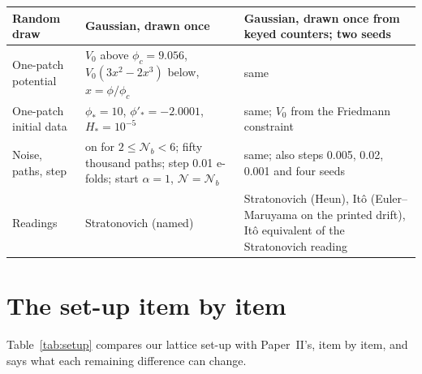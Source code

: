 \documentclass[aps,prd,twocolumn,10pt,superscriptaddress,nofootinbib,longbibliography,floatfix]{revtex4-2}
\newcommand{\Ptwo}{Paper~II}
\begin{document}
\begin{table}
\begin{tabular}{p{}p{}p{}}
Random draw & Gaussian, drawn once & Gaussian, drawn once from keyed counters; two seeds \\
\midrule
One-patch potential & $V_0$ above $\phi_c = 9.056$, $V_0(3x^2-2x^3)$ below, $x = \phi/\phi_c$ & same \\
One-patch initial data & $\phi_* = 10$, $\phi'_* = -2.0001$, $H_* = 10^{-5}$ & same; $V_0$ from the Friedmann constraint \\
Noise, paths, step & on for $2 \le \mathcal{N}_b < 6$; fifty thousand paths; step 0.01 e-folds; start $\alpha = 1$, $\mathcal{N} = \mathcal{N}_b$ & same; also steps 0.005, 0.02, 0.001 and four seeds \\
Readings & Stratonovich (named) & Stratonovich (Heun), It\^o (Euler--Maruyama on the printed drift), It\^o equivalent of the Stratonovich reading \\
\bottomrule
\end{tabular}
\end{table}

\section{The set-up item by item}\label{app:setup}

Table~\ref{tab:setup} compares our lattice set-up with \Ptwo{}'s, item by item, and says what each remaining difference can change.
\end{document}
